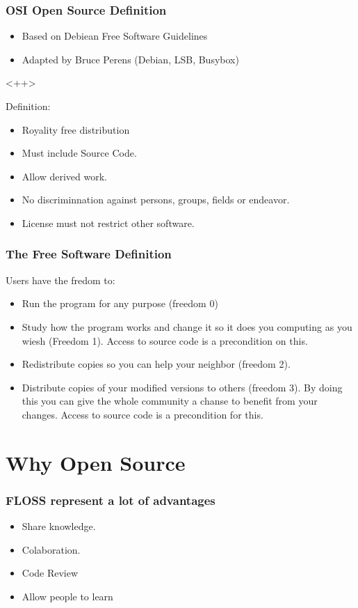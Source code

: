 \documentclass[hyperref={pdfpagelabels=false},xcolor=pst,pdf,fragile]{beamer}
\begin{document}
\begin{frame}
  \frametitle{OSI Open Source Definition}

  \begin{itemize}
	\item Based on Debiean Free Software Guidelines
	\item Adapted by Bruce Perens (Debian, LSB, Busybox)
  \end{itemize}<++>

  Definition:
  \begin{itemize}
	\item Royality free distribution
	\item Must include Source Code.
	\item Allow derived work.
	\item No discriminnation against persons, groups, fields or endeavor.
	\item License must not restrict other software.
  \end{itemize}

\end{frame}

\begin{frame}
  \frametitle{The Free Software Definition}

  Users have the fredom to:

  \begin{itemize}
	\item Run the program for any purpose (freedom 0)
	\item Study how the program works and change it  so it does you
	  computing as you wiesh (Freedom 1). Access to source code is a
	  precondition on this.
	\item Redistribute copies so you can help your neighbor (freedom 2).
	\item Distribute copies of your modified versions to others (freedom
	  3). By doing this you can give the whole community a chanse to
	  benefit from your changes. Access to source code is a precondition
	  for this.
  \end{itemize}

\end{frame}

\section{Why Open Source}

\begin{frame}
  \frametitle{FLOSS represent a lot of advantages}

  \begin{itemize}
	\item Share knowledge.
	\item Colaboration.
	\item Code Review
	\item Allow people to learn
  \end{itemize}

\end{frame}
\end{document}
